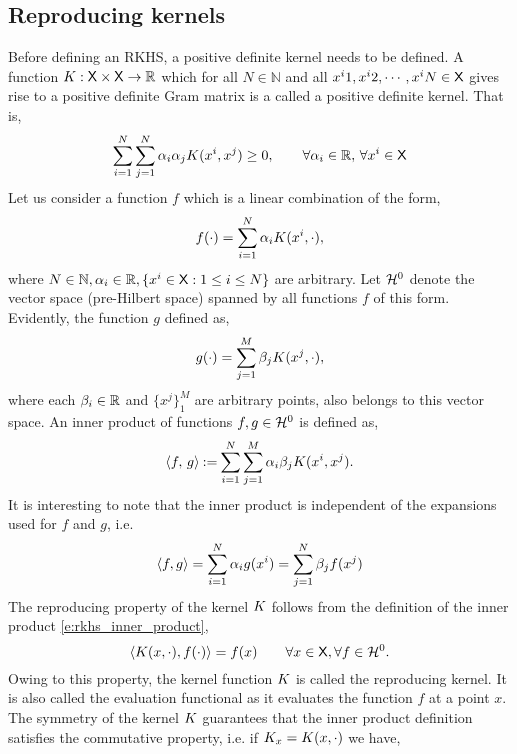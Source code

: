 \subsection{Reproducing kernels} 
Before defining an RKHS, a positive definite kernel needs to be defined. A function $K : {\sf X} \times {\sf X} \to \mathbb{R}$ which for all $N \in \mathbb{N}$ and all $x^i1,x^i2,\cdots,x^iN \in {\sf X}$ gives rise to a positive definite Gram matrix is a called a positive definite kernel. That is, 
\begin{equation}
\sum_{i=1}^N \sum_{j=1}^N \alpha_i \alpha_j K(x^i,x^j) \geq 0, \qquad \forall \alpha_i \in \mathbb{R}, \, \forall x^i \in {\sf X} 
\end{equation}
Let us consider a function $f$ which is a linear combination of the form,
\begin{equation}
f(\cdot) = \sum_{i=1}^N \alpha_i \Kern(x^i, \cdot),
\label{e:rkhs_f_rkhs}
\end{equation}
where $N \in \mathbb{N}, \alpha_i \in \mathbb{R}, \{ x^i \in {\sf X}: 1\leq i \leq N \}$ are arbitrary. Let ${\cal H}^0$ denote the vector space (pre-Hilbert space) spanned by all functions $f$ of this form. Evidently, the function $g$ defined as,  
\begin{equation}
g(\cdot) = \sum_{j=1}^M \rkhsparam_j \Kern(x^j, \cdot),
\label{e:rkhs_g_rkhs}
\end{equation}
where each $\beta_i \in \mathbb{R}$ and $\{x^j\}_1^M$ are arbitrary points, also belongs to this vector space.  An inner product of functions $f,g \in {\cal H}^0$ is defined as,
\begin{equation}
\langle f,\, g \rangle \eqdef \sum_{i=1}^N \sum_{j=1}^M \alpha_i \rkhsparam_j \Kern(x^i, x^j).
\label{e:rkhs_inner_product}
\end{equation}
It is interesting to note that the inner product is independent of the expansions used for $f$ and $g$, i.e.
\begin{equation}
\langle f, g \rangle = \sum_{i=1}^N \alpha_i g(x^i) = \sum_{j=1}^N \beta_j f(x^j)
\end{equation}
The reproducing property of the kernel $K$ follows from the definition of the inner product \eqref{e:rkhs_inner_product},
\begin{equation}
\langle \Kern(x,\cdot), f(\cdot)\rangle = f(x) \qquad \forall x \in \state, \forall f \in \clH^0.
\label{e:rkhs_rep_property}
\end{equation}
Owing to this property, the kernel function $K$ is called the reproducing kernel. It is also called the evaluation functional as it evaluates the function $f$ at a point $x$. The symmetry of the kernel $K$ guarantees that the inner product definition satisfies the commutative property, i.e. if $K_x = K(x, \cdot)$ we have,
